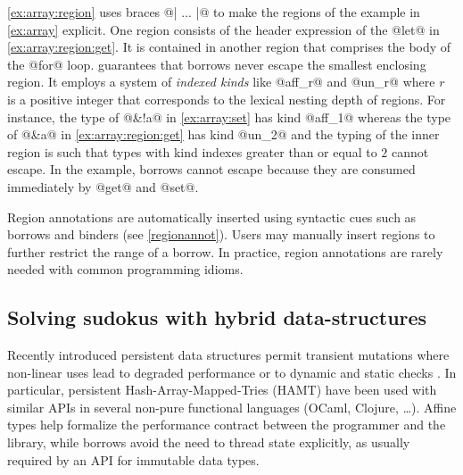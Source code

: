 \cref{ex:array:region} uses braces @{| ... |}@ to make the
regions of the example in \cref{ex:array} explicit.  One
region consists of the header expression of the @let@ in
\cref{ex:array:region:get}. It is contained in another region that
comprises the body of the @for@ loop. \lang guarantees that borrows
never escape the smallest enclosing region. It employs a system of
\emph{indexed kinds} like @aff_r@ and @un_r@ where
$r$ is a positive integer that corresponds to the lexical nesting
depth of regions. For instance, the type of @&!a@ in
\cref{ex:array:set} has kind @aff_1@ whereas the type of
@&a@ in \cref{ex:array:region:get} has kind
@un_2@ and the typing of the inner region is such that types with
kind indexes greater than or equal to $2$ cannot escape.
In the example, borrows cannot escape  because they are consumed
immediately by @get@ and @set@.

Region annotations are automatically inserted using
syntactic cues such as borrows and binders (see
\cref{regionannot}).  Users may manually insert regions to further restrict the range of a
borrow. In practice, region annotations are
rarely needed with common programming idioms.






\subsection{Solving sudokus with hybrid data-structures}

Recently introduced persistent data structures
permit transient mutations where
non-linear uses lead to degraded performance
\cite{DBLP:conf/ml/ConchonF07} or to
dynamic and static checks \cite{DBLP:journals/pacmpl/Puente17}.
In particular, persistent Hash-Array-Mapped-Tries (HAMT) have been used with similar
APIs in several non-pure functional languages (OCaml, Clojure, \dots).
Affine types help formalize the performance contract between the programmer
and the library, while borrows avoid the need to thread state explicitly,
as usually required by an API for immutable data types.
%

